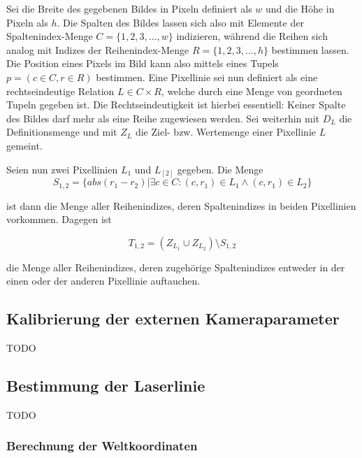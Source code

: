 Sei die Breite des gegebenen Bildes in Pixeln definiert als \(w\) und die Höhe in Pixeln als \(h\). Die Spalten des Bildes  lassen sich also mit Elemente der Spaltenindex-Menge \(C = \lbrace 1, 2, 3, \ldots , w \rbrace\) indizieren, während  die Reihen sich analog mit Indizes der Reihenindex-Menge \(R = \lbrace 1, 2, 3, \ldots , h \rbrace\) bestimmen lassen. Die Position eines Pixels im Bild kann also mittels eines Tupels \(p = (c \in C, r \in R)\) bestimmen. Eine Pixellinie sei nun definiert als eine rechtseindeutige Relation \(L \in C \times R\), welche durch eine Menge von geordneten Tupeln gegeben ist.
Die Rechtseindeutigkeit ist hierbei essentiell: Keiner Spalte des Bildes darf mehr als eine Reihe zugewiesen werden. Sei weiterhin mit \(D_{L}\) die Definitionsmenge und mit \(Z_{L}\) die Ziel- bzw. Wertemenge einer Pixellinie \(L\) gemeint.\newline

Seien nun zwei Pixellinien \(L_{1}\) und \(L_[2]\) gegeben. Die Menge
\begin{equation}
S_{1,2} = \lbrace abs(r_{1} - r_{2}) | \exists c \in C: (c, r_{1}) \in L_{1} \wedge (c, r_{1}) \in L_{2} \rbrace
\end{equation}

ist dann die Menge aller Reihenindizes, deren Spaltenindizes in beiden Pixellinien vorkommen. Dagegen ist

\begin{equation}
T_{1,2} = (Z_{L_{1}} \cup Z_{L_{2}}) \setminus S_{1,2}  
\end{equation}   

die Menge aller Reihenindizes, deren zugehörige Spaltenindizes entweder in der einen oder der anderen Pixellinie auftauchen.



\subsection{Kalibrierung der externen Kameraparameter}
\label{subsec:externeKalibrierung}
TODO

\subsection{Bestimmung der Laserlinie}
\label{subsec:LaserLinieBestimmung}
TODO

\subsubsection{Berechnung der Weltkoordinaten}